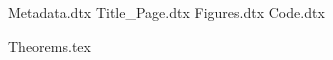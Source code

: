 \ExplSyntaxOn
{Metadata.dtx}
{Title_Page.dtx}
{Figures.dtx}
{Code.dtx}
\ExplSyntaxOff

{Theorems.tex}
